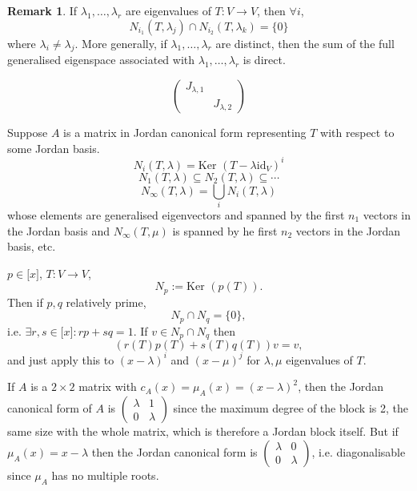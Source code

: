 \documentclass[a4paper]{article}
\newcommand{\Ker}{\text{Ker }}
\newcommand{\id}{\text{id}}
\theoremstyle{definition}
\newtheorem*{remark}{Remark}
\begin{document}
\begin{remark}
    If $\lambda_1,\ldots,\lambda_r$ are eigenvalues of $T:V\rightarrow V$, then $\forall i$,
\[
N_{i_1} (T,\lambda_{j}) \cap N_{i_2} (T,\lambda_{k})=\{0\}
\]
where $\lambda_i \neq \lambda_j$. More generally, if $\lambda_1,\ldots,\lambda_r$ are distinct, then the sum of the full generalised eigenspace associated with $\lambda_1,\ldots,\lambda_r$ is direct.
    
\[
\begin{pmatrix}
    J_{\lambda,1} & \\ & J_{\lambda,2}
    \end{pmatrix}
\]
    
    Suppose $A$ is a matrix in Jordan canonical form representing $T$ with respect to some Jordan basis.
\[
N_i (T,\lambda)=\Ker (T-\lambda \id_V)^i
\]
\[
N_1(T,\lambda) \subseteq N_2(T,\lambda) \subseteq \cdots
\]
\[
N_\infty (T,\lambda) = \bigcup_i N_i (T,\lambda)
\]
whose elements are generalised eigenvectors and spanned by the first $n_1$ vectors in the Jordan basis and $N_\infty (T,\mu)$ is spanned by he first $n_2$ vectors in the Jordan basis, etc.
    
    $p\in \mathbb [x]$, $T:V\rightarrow V$,
\[
N_p := \Ker (p(T)).
\]
Then if $p,q$ relatively prime,
\[
N_p \cap N_q=\{0\},
\]
i.e. $\exists r,s \in \mathbb [x]:rp+sq=1$. If $v\in N_p \cap N_q$ then
\[
(r(T)p(T)+s(T)q(T))v=v,
\]
and just apply this to $(x-\lambda)^i$ and $(x-\mu)^j$ for $\lambda,\mu$ eigenvalues of $T$.
\end{remark}

If $A$ is a $2\times 2$ matrix with $c_{A}(x)=\mu_{A}(x)=(x-\lambda)^2$, then the Jordan canonical form of $A$ is $\begin{pmatrix}\lambda & 1\\0& \lambda\end{pmatrix}$ since the maximum degree of the block is 2, the same size with the whole matrix, which is therefore a Jordan block itself. But if $\mu_{A}(x)=x-\lambda$ then the Jordan canonical form is $\begin{pmatrix}\lambda & 0\\0& \lambda\end{pmatrix}$, i.e. diagonalisable since $\mu_{A}$ has no multiple roots.
\end{document}
